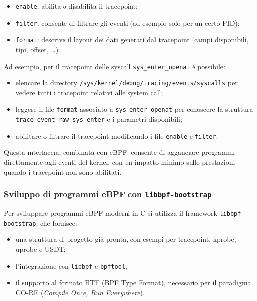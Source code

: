 \begin{itemize}
  \item \texttt{enable}: abilita o disabilita il tracepoint;
  \item \texttt{filter}: consente di filtrare gli eventi (ad esempio solo per un certo PID);
  \item \texttt{format}: descrive il layout dei dati generati dal tracepoint
        (campi disponibili, tipi, offset, \dots).
\end{itemize}

Ad esempio, per il tracepoint delle syscall \texttt{sys\_enter\_openat} è possibile:

\begin{itemize}
  \item elencare la directory \texttt{/sys/kernel/debug/tracing/events/syscalls} per
        vedere tutti i tracepoint relativi alle system call;
  \item leggere il file \texttt{format} associato a
        \texttt{sys\_enter\_openat} per conoscere la struttura\\
        \texttt{trace\_event\_raw\_sys\_enter} e i parametri disponibili;
  \item abilitare o filtrare il tracepoint modificando i file \texttt{enable}
        e \texttt{filter}.
\end{itemize}

Questa interfaccia, combinata con eBPF, consente di agganciare programmi
direttamente agli eventi del kernel, con un impatto minimo sulle prestazioni
quando i tracepoint non sono abilitati.

\subsubsection{Sviluppo di programmi eBPF con \texttt{libbpf-bootstrap}}

Per sviluppare programmi eBPF moderni in C si utilizza il framework
\texttt{libbpf-bootstrap}, che fornisce:

\begin{itemize}
  \item una struttura di progetto già pronta, con esempi per tracepoint, kprobe,
        uprobe e USDT;
  \item l’integrazione con \texttt{libbpf} e \texttt{bpftool};
  \item il supporto al formato BTF (BPF Type Format), necessario per il paradigma
        CO-RE (\emph{Compile Once, Run Everywhere}).
\end{itemize}

